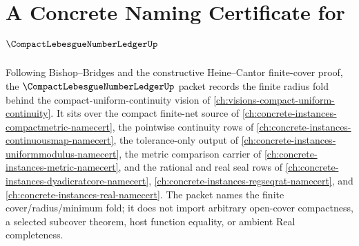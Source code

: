 \chapter{A Concrete Naming Certificate for $\CompactLebesgueNumberLedgerUp$}
\label{ch:concrete-instances-compact-lebesgue-number-ledger-namecert}

Following Bishop--Bridges and the constructive Heine--Cantor finite-cover proof, the $\CompactLebesgueNumberLedgerUp$ packet records the finite radius fold behind the compact-uniform-continuity vision of \autoref{ch:visions-compact-uniform-continuity}. It sits over the compact finite-net source of \autoref{ch:concrete-instances-compactmetric-namecert}, the pointwise continuity rows of \autoref{ch:concrete-instances-continuousmap-namecert}, the tolerance-only output of \autoref{ch:concrete-instances-uniformmodulus-namecert}, the metric comparison carrier of \autoref{ch:concrete-instances-metric-namecert}, and the rational and real seal rows of \autoref{ch:concrete-instances-dyadicratcore-namecert}, \autoref{ch:concrete-instances-regseqrat-namecert}, and \autoref{ch:concrete-instances-real-namecert}. The packet names the finite cover/radius/minimum fold; it does not import arbitrary open-cover compactness, a selected subcover theorem, host function equality, or ambient Real completeness.

